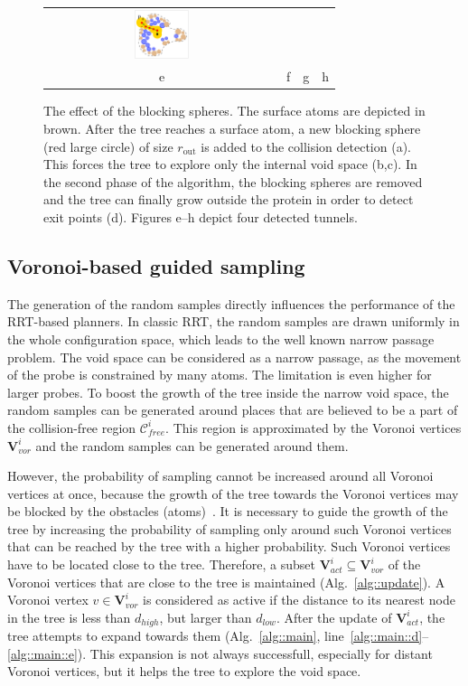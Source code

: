 \documentclass[usletter, 10pt, conference]{svjour3}      %
\def\CF{\mathcal{C}_{free}}
\def\VV{\mathbf{V}_{vor}}
\def\VVA{\mathbf{V}_{act}}
\def\da{d_{high}}
\def\db{d_{low}}
\def\gprobe{r_{\mathrm{out}}}
\begin{document}
\begin{figure}
{\begin{tabular}{cccc}
\includegraphics[width=0.24\textwidth]{fig/blockingb10d} \\
e & f & g & h \\
\end{tabular}
}
\caption{\label{fig::blocking2}
The effect of the blocking spheres. 
The surface atoms are depicted in brown.
After the tree reaches a surface atom, a new blocking sphere (red large circle) of size $\gprobe$ is added to the collision detection (a).
This forces the tree to explore only the internal void space (b,c).
In the second phase of the algorithm, the blocking spheres are removed and the tree can finally grow outside the protein in order
to detect exit points (d).
Figures e--h depict four detected tunnels.
}
\end{figure}

\subsection{Voronoi-based guided sampling}
\label{sec::vbg}

The generation of the random samples directly influences the performance of the RRT-based planners.
In classic RRT, the random samples are drawn uniformly in the whole configuration space, which leads to the well known narrow passage problem.
The void space can be considered as a narrow passage, as the movement of the probe is constrained by many atoms.
The limitation is even higher for larger probes.
To boost the growth of the tree inside the narrow void space, the random samples can be generated around places that are believed to be a part
of the collision-free region $\CF^i$.
This region is approximated by the Voronoi vertices $\VV^i$ and the random samples can be generated around them.

However, the probability of sampling cannot be increased around all Voronoi vertices at once, because the growth of the tree towards the Voronoi vertices may be blocked by the obstacles (atoms)~\cite{vonasekphd}.
It is necessary to guide the growth of the tree by increasing the probability of sampling only around such Voronoi vertices that can be reached by the tree with a higher probability.
Such Voronoi vertices have to be located close to the tree.
Therefore, a subset $\VVA^i \subseteq \VV^i$ of the Voronoi vertices that are close to the tree is maintained (Alg.~\ref{alg::update}).
A Voronoi vertex $v \in \VV^i$ is considered as active if the distance to its nearest node in the tree is less than $\da$, but larger than
$\db$.
After the update of $\VVA^i$, the tree attempts to expand towards them (Alg.~\ref{alg::main}, line~\ref{alg::main::d}--\ref{alg::main::e}).
This expansion is not always successfull, especially for distant Voronoi vertices, but it helps the tree to explore
the void space.
\end{document}
